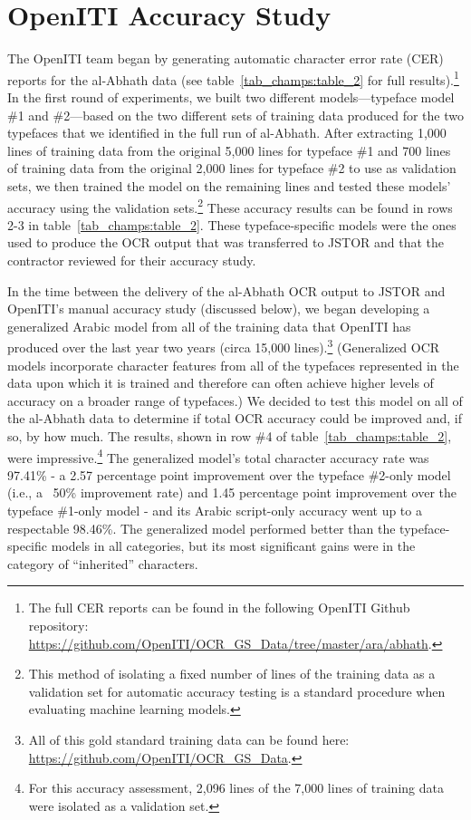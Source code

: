 \section{OpenITI Accuracy Study}

The OpenITI team began by generating automatic character error rate (CER)
reports for the al-Abhath data (see table~\ref{tab_champs:table_2} for full
results).\footnote{The full CER reports can be found in the following OpenITI
Github repository:
\url{https://github.com/OpenITI/OCR_GS_Data/tree/master/ara/abhath}.} In the
first round of experiments, we built two different models—typeface model \#1
and \#2—based on the two different sets of training data produced for the two
typefaces that we identified in the full run of al-Abhath. After extracting
1,000 lines of training data from the original 5,000 lines for typeface \#1 and
700 lines of training data from the original 2,000 lines for typeface \#2 to
use as validation sets, we then trained the model on the remaining lines and
tested these models’ accuracy using the validation sets.\footnote{This method
of isolating a fixed number of lines of the training data as a validation set
for automatic accuracy testing is a standard procedure when evaluating machine
learning models.} These accuracy results can be found in rows 2-3 in
table~\ref{tab_champs:table_2}.  These typeface-specific models were the ones
used to produce the OCR output that was transferred to JSTOR and that the
contractor reviewed for their accuracy study.

In the time between the delivery of the al-Abhath OCR output to JSTOR and
OpenITI’s manual accuracy study (discussed below), we began developing a
generalized Arabic model from all of the training data that OpenITI has
produced over the last year two years (circa 15,000 lines).\footnote{All of
this gold standard training data can be found here:
\url{https://github.com/OpenITI/OCR_GS_Data}.} (Generalized OCR models
incorporate character features from all of the typefaces represented in the
data upon which it is trained and therefore can often achieve higher levels of
accuracy on a broader range of typefaces.) We decided to test this model on all
of the al-Abhath data to determine if total OCR accuracy could be improved and,
if so, by how much. The results, shown in row \#4 of table~\ref{tab_champs:table_2}, were
impressive.\footnote{For this accuracy assessment, 2,096 lines of the 7,000
lines of training data were isolated as a validation set.} The generalized
model’s  total character accuracy rate was 97.41\% - a 2.57 percentage point
improvement over the typeface \#2-only model (i.e., a ~50\% improvement rate)
and 1.45 percentage point improvement over the typeface \#1-only model - and
its Arabic script-only accuracy went up to a respectable 98.46\%. The
generalized model performed better than the typeface-specific models in all
categories, but its most significant gains were in the category of “inherited”
characters.

